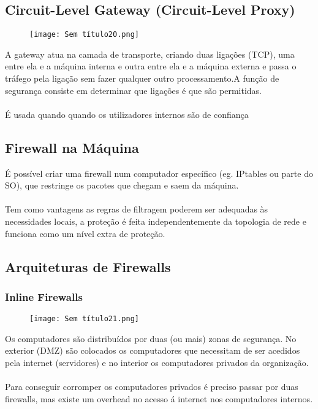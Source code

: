 \documentclass[10pt,a4paper]{report}
\begin{document}
\subsection{Circuit-Level Gateway (Circuit-Level Proxy)}
\begin{figure}[H]
\centering
\texttt{[image: Sem título20.png]}
\end{figure}
A gateway atua na camada de transporte, criando duas ligações (TCP), uma entre ela e a máquina interna e outra entre
ela e a máquina externa e passa o tráfego pela ligação sem fazer qualquer outro processamento.A função de segurança consiste em determinar que ligações é que são permitidas.\\
\\
É usada quando quando os utilizadores internos são de confiança
\subsection{Firewall na Máquina}
É possível criar uma firewall num computador específico (eg. IPtables ou parte do SO), que restringe os pacotes que chegam e saem da máquina.\\
\\
Tem como vantagens as regras de filtragem poderem ser adequadas às necessidades locais, a proteção é feita independentemente da topologia de rede e funciona como um nível extra de proteção.
\subsection{Arquiteturas de Firewalls}
\subsubsection{Inline Firewalls}
\begin{figure}[H]
\centering
\texttt{[image: Sem título21.png]}
\end{figure}
Os computadores são distribuídos por duas (ou mais) zonas de segurança. No exterior (DMZ) são colocados os computadores que necessitam de ser acedidos pela internet (servidores) e no interior os computadores privados da organização.\\
\\
Para conseguir corromper os computadores privados é preciso passar por duas firewalls, mas existe um overhead no acesso á internet nos computadores internos.
\end{document}
